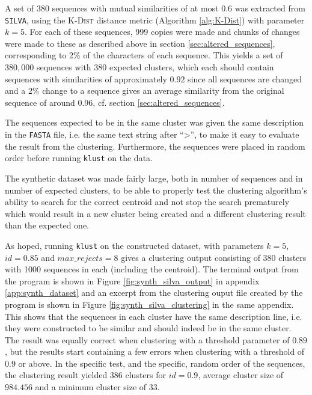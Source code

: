 A set of 380 sequences with mutual similarities of at most 0.6 was extracted
from \texttt{SILVA}, using the \textsc{K-Dist} distance metric (Algorithm
\ref{alg:K-Dist}) with parameter $k=5$. For each of these sequences, 999 copies
were made and chunks of changes were made to these as described above in
section \ref{sec:altered_sequences}, corresponding to 2\% of the characters of
each sequence. This yields a set of $380,000$ sequences with 380 expected
clusters, which each should contain sequences with similarities of
approximately $0.92$ since all sequences are changed and a 2\% change to a
sequence gives an average similarity from the original sequence of around
$0.96$, cf. section \ref{sec:altered_sequences}.

The sequences expected to be in the same cluster was given the same description
in the \texttt{FASTA} file, i.e. the same text string after ``>'', to make it
easy to evaluate the result from the clustering. Furthermore, the sequences
were placed in random order before running \texttt{klust} on the data.

The synthetic dataset was made fairly large, both in number of sequences and in
number of expected clusters, to be able to properly test the clustering
algorithm's ability to search for the correct centroid and not stop the search
prematurely which would result in a new cluster being created and a different
clustering result than the expected one.

As hoped, running \texttt{klust} on the constructed dataset, with parameters
$k=5$, $id=0.85$ and $max\_rejects=8$ gives a clustering output consisting of
380 clusters with 1000 sequences in each (including the centroid). The terminal
output from the program is shown in Figure \ref{fig:synth_silva_output} in
appendix \ref{app:synth_dataset} and an excerpt from the clustering ouput file
created by the program is shown in Figure \ref{fig:synth_silva_clustering} in
the same appendix. This shows that the sequences in each cluster have the same
description line, i.e. they were constructed to be similar and should indeed be
in the same cluster. The result was equally correct when clustering with a
threshold parameter of $0.89$, but the results start containing a few errors
when clustering with a threshold of $0.9$ or above. In the specific test, and
the specific, random order of the sequences, the clustering result yielded 386
clusters for $id=0.9$, average cluster size of $984.456$ and a minimum cluster
size of $33$.


